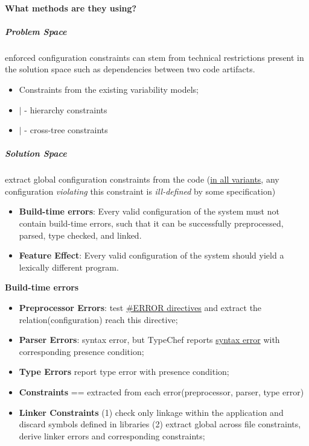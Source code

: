 \documentclass[12pt]{article}
\begin{document}
\paragraph{What methods are they using?} 
\subparagraph{Problem Space} enforced configuration constraints can stem from technical restrictions present in the solution space such as dependencies between two code artifacts.
\begin{itemize}
	\item Constraints from the existing variability models;
	\item $\mid$ - hierarchy constraints
	\item $\mid$ - cross-tree constraints
\end{itemize}
\subparagraph{Solution Space} extract global configuration constraints from the code (\underline{in all variants}, any configuration \textit{violating} this constraint is \textit{ill-defined} by some specification)
\begin{itemize}
	\item \textbf{Build-time errors}: Every valid configuration of the system must not contain build-time errors, such that it can be successfully preprocessed, parsed, type checked, and linked.
	\item \textbf{Feature Effect}: Every valid configuration of the system should yield a lexically different program.
\end{itemize}

\textbf{Build-time errors}\\
\begin{itemize}
	\item \textbf{Preprocessor Errors}: test \underline{\#ERROR directives} and extract the relation(configuration) reach this directive;
	\item \textbf{Parser Errors}: syntax error, but TypeChef reports \underline{syntax error} with corresponding presence condition;
	\item \textbf{Type Errors} report type error with presence condition;
	\item \textbf{Constraints} == extracted from each error(preprocessor, parser, type error)
	\item \textbf{Linker Constraints} (1) check only linkage within the application and discard symbols defined in libraries (2) extract global across file constraints, derive linker errors and corresponding constraints;
\end{itemize}
\end{document}
